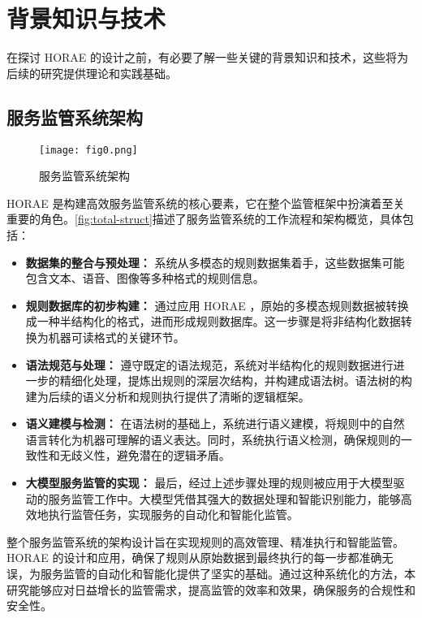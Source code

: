 \newpage

\section{背景知识与技术}

在探讨 HORAE 的设计之前，有必要了解一些关键的背景知识和技术，这些将为后续的研究提供理论和实践基础。

\subsection{服务监管系统架构}

\begin{figure}[ht]
    \centering
    \texttt{[image: fig0.png]}
    \caption{\label{fig:total-struct}服务监管系统架构}
\end{figure}

 HORAE 是构建高效服务监管系统的核心要素，它在整个监管框架中扮演着至关重要的角色。\autoref{fig:total-struct}描述了服务监管系统的工作流程和架构概览，具体包括：

\begin{itemize}
    \item \textbf{数据集的整合与预处理：} 系统从多模态的规则数据集着手，这些数据集可能包含文本、语音、图像等多种格式的规则信息。
    \item \textbf{规则数据库的初步构建：} 通过应用 HORAE ，原始的多模态规则数据被转换成一种半结构化的格式，进而形成规则数据库。这一步骤是将非结构化数据转换为机器可读格式的关键环节。
    \item \textbf{语法规范与处理：} 遵守既定的语法规范，系统对半结构化的规则数据进行进一步的精细化处理，提炼出规则的深层次结构，并构建成语法树。语法树的构建为后续的语义分析和规则执行提供了清晰的逻辑框架。
    \item \textbf{语义建模与检测：} 在语法树的基础上，系统进行语义建模，将规则中的自然语言转化为机器可理解的语义表达。同时，系统执行语义检测，确保规则的一致性和无歧义性，避免潜在的逻辑矛盾。
    \item \textbf{大模型服务监管的实现：} 最后，经过上述步骤处理的规则被应用于大模型驱动的服务监管工作中。大模型凭借其强大的数据处理和智能识别能力，能够高效地执行监管任务，实现服务的自动化和智能化监管。
\end{itemize}

整个服务监管系统的架构设计旨在实现规则的高效管理、精准执行和智能监管。 HORAE 的设计和应用，确保了规则从原始数据到最终执行的每一步都准确无误，为服务监管的自动化和智能化提供了坚实的基础。通过这种系统化的方法，本研究能够应对日益增长的监管需求，提高监管的效率和效果，确保服务的合规性和安全性。

